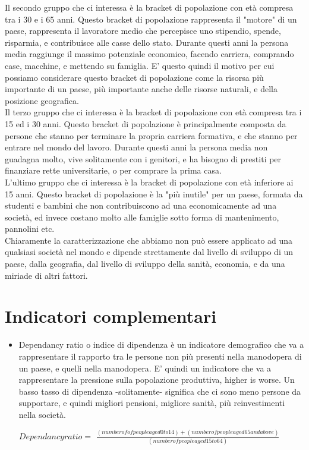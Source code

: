 \documentclass[11pt, oneside]{article}   	%
\begin{document}
Il secondo gruppo che ci interessa è la bracket di popolazione con età compresa tra i 30 e i 65 anni. Questo bracket di popolazione rappresenta il "motore" di un paese, rappresenta il lavoratore medio che percepisce uno stipendio, spende, risparmia, e contribuisce alle casse dello stato. Durante questi anni la persona media raggiunge il massimo potenziale economico, facendo carriera, comprando case, macchine, e mettendo su famiglia. E' questo quindi il motivo per cui possiamo considerare questo bracket di popolazione come la risorsa più importante di un paese, più importante anche delle risorse naturali, e della posizione geografica.\\

Il terzo gruppo che ci interessa è la bracket di popolazione con età compresa tra i 15 ed i 30 anni. Questo bracket di popolazione è principalmente composta da persone che stanno per terminare la propria carriera formativa, e che stanno per entrare nel mondo del lavoro.
Durante questi anni la persona media non guadagna molto, vive solitamente con i genitori, e ha bisogno di prestiti per finanziare rette universitarie, o per comprare la prima casa.\\

L'ultimo gruppo che ci interessa è la bracket di popolazione con età inferiore ai 15 anni. Questo bracket di popolazione è la "più inutile" per un paese, formata da studenti e bambini che non contribuiscono ad una economicamente ad una società, ed invece costano molto alle famiglie sotto forma di mantenimento, pannolini etc.\\

Chiaramente la caratterizzazione che abbiamo non può essere applicato ad una qualsiasi società nel mondo e dipende strettamente dal livello di sviluppo di un paese, dalla geografia, dal livello di sviluppo della sanità, economia, e da una miriade di altri fattori. 

\section{Indicatori complementari}
\begin{itemize}
\item Dependancy ratio o indice di dipendenza è un indicatore demografico che va a rappresentare il rapporto tra le persone non più presenti nella manodopera di un paese, e quelli nella manodopera. E' quindi un indicatore che va a rappresentare la pressione sulla popolazione produttiva, higher is worse. Un basso tasso di dipendenza -solitamente- significa che ci sono meno persone da supportare, e quindi migliori pensioni, migliore sanità, più reinvestimenti nella società.
\begin{center}
$Dependancy ratio =$ $\frac{(number of of people aged 0 to 14) + (number of people aged 65 and above)}{(number of people aged 15 to 64)}$
\end{center}

\end{itemize}
\end{document}
